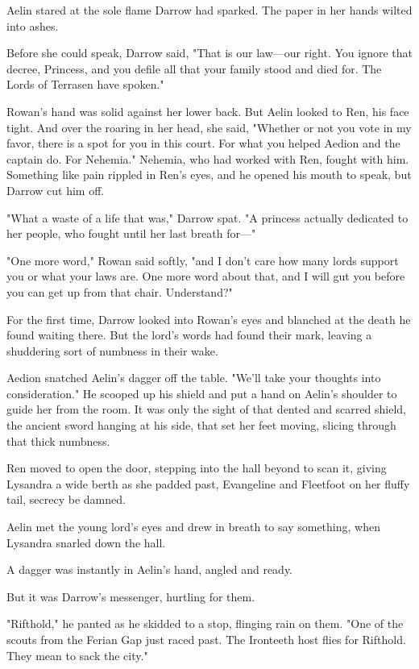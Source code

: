 Aelin stared at the sole flame Darrow had sparked.
The paper in her hands wilted into ashes.

Before she could speak, Darrow said, "That is our law---our right.
You ignore that decree, Princess, and you defile all that your family stood and died for.
The Lords of Terrasen have spoken."

Rowan's hand was solid against her lower back.
But Aelin looked to Ren, his face tight.
And over the roaring in her head, she said, "Whether or not you vote in my favor, there is a spot for you in this court.
For what you helped Aedion and the captain do.
For Nehemia."
Nehemia, who had worked with Ren, fought with him.
Something like pain rippled in Ren's eyes, and he opened his mouth to speak, but Darrow cut him off.

"What a waste of a life that was," Darrow spat.
"A princess actually dedicated to her people, who fought until her last breath for---"

"One more word," Rowan said softly, "and I don't care how many lords support you or what your laws are.
One more word about that, and I will gut you before you can get up from that chair.
Understand?"

For the first time, Darrow looked into Rowan's eyes and blanched at the death he found waiting there.
But the lord's words had found their mark, leaving a shuddering sort of numbness in their wake.

Aedion snatched Aelin's dagger off the table.
"We'll take your thoughts into consideration."
He scooped up his shield and put a hand on Aelin's shoulder to guide her from the room.
It was only the sight of that dented and scarred shield, the ancient sword hanging at his side, that set her feet moving, slicing through that thick numbness.

Ren moved to open the door, stepping into the hall beyond to scan it, giving Lysandra a wide berth as she padded past, Evangeline and Fleetfoot on her fluffy tail, secrecy be damned.

Aelin met the young lord's eyes and drew in breath to say something, when Lysandra snarled down the hall.

A dagger was instantly in Aelin's hand, angled and ready.

But it was Darrow's messenger, hurtling for them.

"Rifthold," he panted as he skidded to a stop, flinging rain on them.
"One of the scouts from the Ferian Gap just raced past.
The Ironteeth host flies for Rifthold.
They mean to sack the city." 

